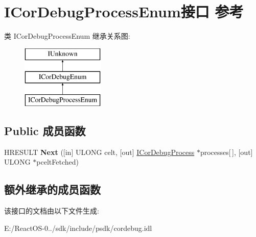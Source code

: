 \hypertarget{interface_i_cor_debug_process_enum}{}\section{I\+Cor\+Debug\+Process\+Enum接口 参考}
\label{interface_i_cor_debug_process_enum}
类 I\+Cor\+Debug\+Process\+Enum 继承关系图\+:\begin{figure}[H]
\begin{center}
\leavevmode
\includegraphics[height=3.000000cm]{interface_i_cor_debug_process_enum}
\end{center}
\end{figure}
\subsection*{Public 成员函数}
\begin{DoxyCompactItemize}
\item 
\mbox{\label{interface_i_cor_debug_process_enum_a93aedfd5a25e7ddacfaced78b887ae8f}} 
H\+R\+E\+S\+U\+LT {\bfseries Next} (\mbox{[}in\mbox{]} U\+L\+O\+NG celt, \mbox{[}out\mbox{]} \hyperlink{interface_i_cor_debug_process}{I\+Cor\+Debug\+Process} $\ast$processes\mbox{[}$\,$\mbox{]}, \mbox{[}out\mbox{]} U\+L\+O\+NG $\ast$pcelt\+Fetched)
\end{DoxyCompactItemize}
\subsection*{额外继承的成员函数}


该接口的文档由以下文件生成\+:\begin{DoxyCompactItemize}
\item 
E\+:/\+React\+O\+S-\/0../sdk/include/psdk/cordebug.\+idl\end{DoxyCompactItemize}
